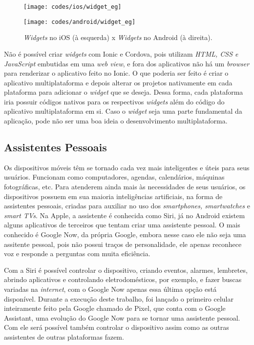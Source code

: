 \begin{figure}[H]
	\centering
	\begin{minipage}{.5\textwidth}
		\centering
		\texttt{[image: codes/ios/widget\_eg]}
	\end{minipage}%
	\begin{minipage}{.5\textwidth}
		\centering
		\texttt{[image: codes/android/widget\_eg]}
	\end{minipage}
\caption[\textit{Widgets} no iOS (à esquerda) x \textit{Widgets} no Android (à direita).]{\textit{Widgets} no iOS (à esquerda) x \textit{Widgets} no Android (à direita).}
\label{fig:widgets_sample}
\end{figure}

Não é possível criar \textit{widgets} com Ionic e Cordova, pois utilizam \textit{HTML, CSS e JavaScript} embutidas em uma \textit{web view}, e fora dos aplicativos não há um \textit{browser} para renderizar o aplicativo 
feito no Ionic. O que poderia ser feito é criar o aplicativo multiplataforma e depois alterar os projetos nativamente em cada plataforma para adicionar o \textit{widget} que se deseja. Dessa forma, cada plataforma iria 
possuir códigos nativos para os respectivos \textit{widgets} além do código do aplicativo multiplataforma em si. Caso o \textit{widget} seja uma parte fundamental da aplicação, pode não ser uma boa ideia o 
desenvolvimento multiplataforma. 

\subsection{Assistentes Pessoais} \label{subsec:siri}
Os dispositivos móveis têm se tornado cada vez mais inteligentes e úteis para seus usuários. Funcionam como computadores, agendas, calendários, máquinas fotográficas, etc. Para atenderem ainda mais às necessidades de 
seus usuários, os dispositivos possuem em sua maioria inteligências artificiais, na forma de assistentes pessoais, criadas para auxiliar no uso dos \textit{smartphones, smartwatches} e \textit{smart TVs}. 
Na Apple, a assistente é conhecida como Siri, já no Android existem alguns aplicativos de terceiros que tentam criar uma assistente pessoal. O mais conhecido é Google Now, da própria Google, 
embora nesse caso ele não seja uma assitente pessoal, pois não possui traços de personalidade, ele apenas reconhece voz e responde a perguntas com muita eficiência.

Com a Siri é possível controlar o dispositivo, criando eventos, alarmes, lembretes, abrindo aplicativos e controlando eletrodomésticos, por exemplo, e fazer buscas variadas na \textit{internet}, com o Google Now 
apenas essa última opção está disponível. Durante a execução deste trabalho, foi lançado o primeiro celular inteiramente feito pela Google chamado de Pixel, que conta com o Google Assistant, uma evolução do Google Now 
para se tornar uma assistente pessoal. Com ele será possível também controlar o dispositivo assim como as outras assistentes de outras plataformas fazem. 

